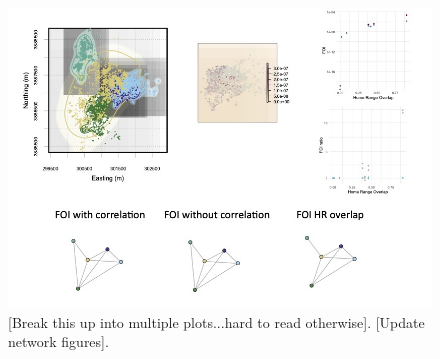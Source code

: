 \documentclass[letterpaper]{article}
\begin{document}
\begin{figure}
     \includegraphics[width=\textwidth]{figures/deer_results.jpg}
    \caption{[Break this up into multiple plots...hard to read otherwise]. [Update network figures].}
	\label{fig:empiricalres}
\end{figure}

\clearpage


\end{document}
